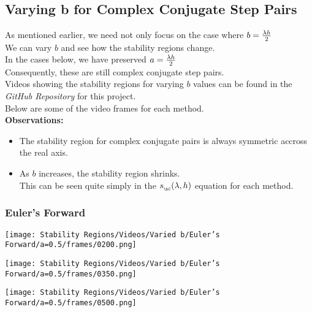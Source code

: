 \subsection{Varying b for Complex Conjugate Step Pairs}
\par As mentioned earlier, we need not only focus on the case where $b = \frac{\lambda h}{2}$\\
We can vary $b$ and see how the stability regions change.\\
In the cases below, we have preserved $a = \frac{\lambda h}{2}$\\
Consequently, these are still complex conjugate step pairs.\\
Videos showing the stability regions for varying $b$ values can be found in the \textit{GitHub Repository}\cite{GitHub_Repo} for this project.\\
Below are some of the video frames for each method.\\
\textbf{Observations:}
\begin{itemize}
	\item The stability region for complex conjugate pairs is always symmetric accross the real axis.\\
	      
	\item As $b$ increases, the stability region shrinks.\\
	      This can be seen quite simply in the $s_{_{\bC}}(\lambda, h)$ equation for each method.
\end{itemize}
\subsubsection{Euler's Forward}
\begin{multicols}{3}
	\begin{center}
		\texttt{[image: Stability Regions/Videos/Varied b/Euler's Forward/a=0.5/frames/0200.png]}
	\end{center}
	\columnbreak{}
	\begin{center}
		\texttt{[image: Stability Regions/Videos/Varied b/Euler's Forward/a=0.5/frames/0350.png]}
	\end{center}
	\columnbreak{}
	\begin{center}
		\texttt{[image: Stability Regions/Videos/Varied b/Euler's Forward/a=0.5/frames/0500.png]}
	\end{center}
\end{multicols}

